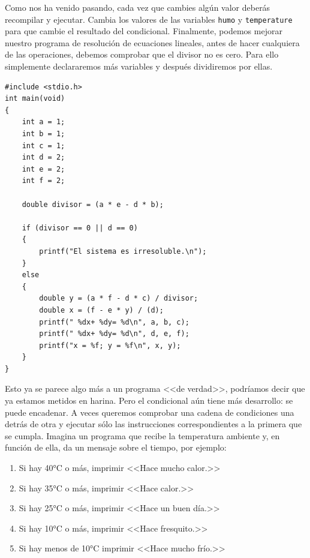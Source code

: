 \documentclass[a4paper]{article}
\newcommand{\centigrade}{°C}
\begin{document}
Como nos ha venido pasando, cada vez que cambies algún valor deberás recompilar
y ejecutar. Cambia los valores de las variables \texttt{humo} y
\texttt{temperature} para que cambie el resultado del condicional. Finalmente,
podemos mejorar nuestro programa de resolución de ecuaciones
lineales, antes de hacer cualquiera de las operaciones, debemos comprobar que
el divisor no es cero. Para ello simplemente declararemos más variables y
después dividiremos por ellas.


\noindent
\begin{minipage}[H]{\linewidth}
\mbox{}
\begin{lstlisting}[style=C,
caption={Programa de resolución de ecuaciones lineales con condicionales},
label={lst:linealSystemConditional}]
#include <stdio.h>
int main(void)
{
    int a = 1;
    int b = 1;
    int c = 1;
    int d = 2;
    int e = 2;
    int f = 2;

    double divisor = (a * e - d * b);

    if (divisor == 0 || d == 0)
    {
        printf("El sistema es irresoluble.\n");
    }
    else
    {
        double y = (a * f - d * c) / divisor;
        double x = (f - e * y) / (d);
        printf(" %dx+ %dy= %d\n", a, b, c);
        printf(" %dx+ %dy= %d\n", d, e, f);
        printf("x = %f; y = %f\n", x, y);
    }
}
\end{lstlisting}
\end{minipage}


Esto ya se parece algo más a un programa <<de verdad>>, podríamos decir que ya
estamos metidos en harina. Pero el condicional aún tiene más desarrollo: se
puede encadenar. A veces queremos comprobar una cadena de condiciones una
detrás de otra y ejecutar sólo las instrucciones correspondientes a la primera
que se cumpla. Imagina un programa que recibe la temperatura ambiente y, en
función de ella, da un mensaje sobre el tiempo, por ejemplo:
\begin{enumerate}
\item Si hay  40\centigrade{} o más, imprimir <<Hace mucho calor.>>
\item Si hay  35\centigrade{} o más, imprimir <<Hace calor.>>
\item Si hay  25\centigrade{} o más, imprimir <<Hace un buen día.>>
\item Si hay  10\centigrade{} o más, imprimir <<Hace fresquito.>>
\item Si hay menos de 10\centigrade{} imprimir <<Hace mucho frío.>>
\end{enumerate}
\end{document}
